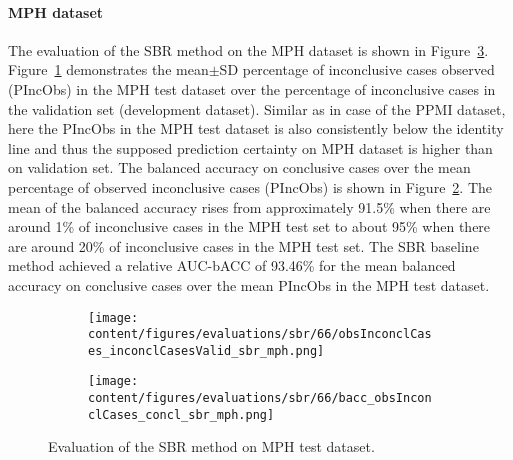 
\paragraph{MPH dataset}

The evaluation of the SBR method on the MPH dataset is shown in Figure~\ref{fig:perf_results_sbr_mph}.
Figure~\ref{fig:obsInconclCases_inconclCasesValid_sbr_mph} demonstrates 
the mean$\pm$SD percentage of inconclusive cases observed (PIncObs) in the MPH test dataset 
over the percentage of inconclusive cases in the validation set (development dataset).
Similar as in case of the PPMI dataset, here the PIncObs in the MPH test dataset
is also consistently below the identity line 
and thus the supposed prediction certainty on MPH dataset is higher than on validation set.
The balanced accuracy on conclusive cases over the mean percentage of observed inconclusive cases (PIncObs) is shown 
in Figure~\ref{fig:bacc_obsInconclCases_concl_sbr_mph}.
The mean of the balanced accuracy rises from approximately 91.5\% 
when there are around 1\% of inconclusive cases in the MPH test set to about 95\% 
when there are around 20\% of inconclusive cases in the MPH test set.
The SBR baseline method achieved a relative AUC-bACC of 93.46\% for the mean balanced accuracy on conclusive cases 
over the mean PIncObs in the MPH test dataset.


\begin{figure}[ht]
  \begin{subfigure}{0.49\textwidth}
    \centering
    \texttt{[image: content/figures/evaluations/sbr/66/obsInconclCases\_inconclCasesValid\_sbr\_mph.png]}
    \label{fig:obsInconclCases_inconclCasesValid_sbr_mph}
  \end{subfigure}
  \hfill
  \begin{subfigure}{0.49\textwidth}
    \centering
    \texttt{[image: content/figures/evaluations/sbr/66/bacc\_obsInconclCases\_concl\_sbr\_mph.png]}
    \label{fig:bacc_obsInconclCases_concl_sbr_mph}
  \end{subfigure}
  \caption{Evaluation of the SBR method on MPH test dataset.}
  \label{fig:perf_results_sbr_mph}
\end{figure}

